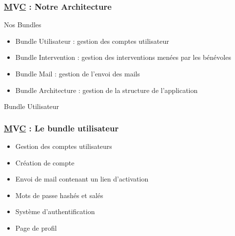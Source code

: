 
\begin{frame}
  \frametitle{\underline{M}V\underline{C} : Notre Architecture}
  \begin{block}{Nos Bundles}
  \begin{itemize}
  \item Bundle Utilisateur : gestion des comptes utilisateur
  \item Bundle Intervention : gestion des interventions menées par les bénévoles
  \item Bundle Mail : gestion de l'envoi des mails
  \item Bundle Architecture : gestion de la structure de l'application
  \end{itemize}
  \end{block}   
  \end{frame}


\begin{frame}
\begin{block}{Bundle Utilisateur}
\frametitle{\underline{M}V\underline{C} : Le bundle utilisateur}
\begin{itemize}
\item Gestion des comptes utilisateurs
\item Création de compte
\item Envoi de mail contenant un lien d'activation
\item Mots de passe hashés et salés
\item Système d'authentification
\item Page de profil 
\end{itemize}
\end{block}
\end{frame}
